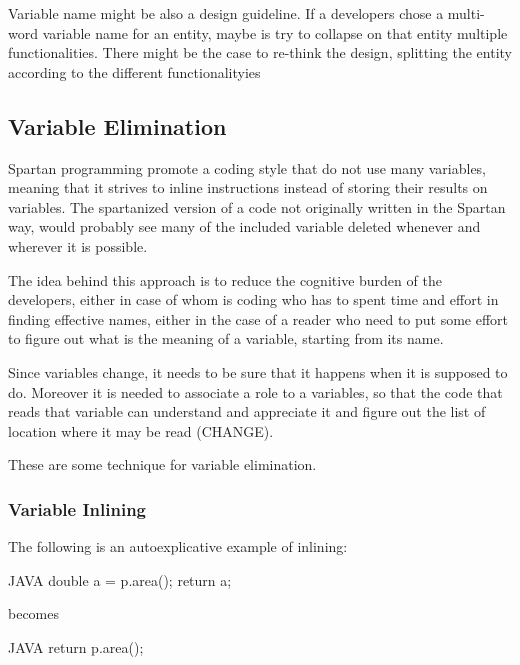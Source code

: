 Variable name might be also a design guideline. If a developers chose a multi-word variable name for an 
entity, maybe is try to collapse on that entity multiple functionalities. 
There might be the case to re-think the design, splitting the entity according to the different functionalityies 


\subsection{Variable Elimination}

Spartan programming promote a coding style that do not use many variables, meaning that it strives to inline instructions instead of 
storing their results on variables. The spartanized version of a code not originally written in the Spartan way, would 
probably see many of the included variable deleted whenever and wherever it is possible.

The idea behind this approach is to reduce the cognitive burden of the developers, either in case of whom is coding who has to spent
time and effort in finding effective names, either in the case of a reader who need to put some effort to figure out what is the meaning of 
a variable, starting from its name. 

Since variables change, it needs to be sure that it happens when it is supposed to do. Moreover it is needed to associate a role to a variables,
so that the code that reads that variable can understand and appreciate it and figure out the list of location where it may be read (CHANGE).

These are some technique for variable elimination.

\subsubsection{Variable Inlining}

The following is an autoexplicative example of inlining:

\begin{code}{JAVA}
double a = p.area();
return a; 
\end{code}

becomes

\begin{code}{JAVA}
return p.area();  
\end{code}

